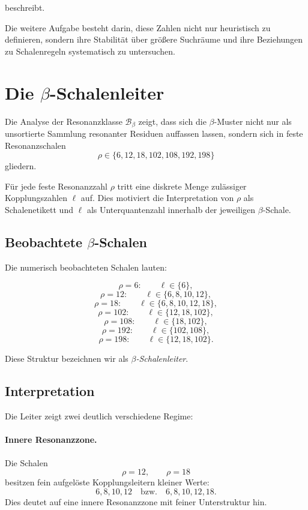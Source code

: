 \documentclass[11pt,a4paper]{article}
\theoremstyle{definition}
\theoremstyle{plain}
\theoremstyle{remark}
\begin{document}
	beschreibt.
	
	Die weitere Aufgabe besteht darin, diese Zahlen nicht nur heuristisch zu definieren, sondern ihre Stabilität über größere Suchräume und ihre Beziehungen zu Schalenregeln systematisch zu untersuchen.
	
	\section{Die \texorpdfstring{$\beta$}{beta}-Schalenleiter}
	
	Die Analyse der Resonanzklasse \(\mathcal B_\beta\) zeigt, dass sich die \(\beta\)-Muster nicht nur als unsortierte Sammlung resonanter Residuen auffassen lassen, sondern sich in feste Resonanzschalen
	\[
	\rho \in \{6,12,18,102,108,192,198\}
	\]
	gliedern.
	
	Für jede feste Resonanzzahl \(\rho\) tritt eine diskrete Menge zulässiger Kopplungszahlen \(\ell\) auf. 
	Dies motiviert die Interpretation von \(\rho\) als Schalenetikett und \(\ell\) als Unterquantenzahl innerhalb der jeweiligen \(\beta\)-Schale.
	
	\subsection{Beobachtete \texorpdfstring{$\beta$}{beta}-Schalen}
	
	Die numerisch beobachteten Schalen lauten:
	
	\[
	\rho=6:\qquad \ell\in\{6\},
	\]
	\[
	\rho=12:\qquad \ell\in\{6,8,10,12\},
	\]
	\[
	\rho=18:\qquad \ell\in\{6,8,10,12,18\},
	\]
	\[
	\rho=102:\qquad \ell\in\{12,18,102\},
	\]
	\[
	\rho=108:\qquad \ell\in\{18,102\},
	\]
	\[
	\rho=192:\qquad \ell\in\{102,108\},
	\]
	\[
	\rho=198:\qquad \ell\in\{12,18,102\}.
	\]
	
	Diese Struktur bezeichnen wir als \emph{\(\beta\)-Schalenleiter}.
	
	\subsection{Interpretation}
	
	Die Leiter zeigt zwei deutlich verschiedene Regime:
	
	\paragraph{Innere Resonanzzone.}
	Die Schalen
	\[
	\rho=12,\qquad \rho=18
	\]
	besitzen fein aufgelöste Kopplungsleitern kleiner Werte:
	\[
	6,8,10,12
	\quad\text{bzw.}\quad
	6,8,10,12,18.
	\]
	Dies deutet auf eine innere Resonanzzone mit feiner Unterstruktur hin.
	
\end{document}
